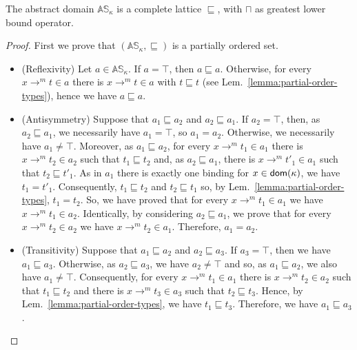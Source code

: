 \begin{proposition}\label{prop:complete_lattice}
  The abstract domain $\mathbb{AS}_\kappa$ is a complete lattice \wrt $\sqsubseteq$,
  with $\sqcap$ as greatest lower bound operator.
\end{proposition}
\begin{proof}
  First we prove that $(\mathbb{AS}_\kappa,\sqsubseteq)$ is a partially
  ordered set.
  \begin{itemize}
    \item (Reflexivity) Let $a\in\mathbb{AS}_\kappa$. If $a=\top$, then
      $a\sqsubseteq a$.
      Otherwise, for every $x\to^mt\in a$ there is $x\to^mt\in a$ with
    $t\sqsubseteq t$ (see Lem.~\ref{lemma:partial-order-types}), hence we have
    $a\sqsubseteq a$.
    \item (Antisymmetry) Suppose that $a_1 \sqsubseteq a_2$ and
    $a_2 \sqsubseteq a_1$. If $a_2=\top$, then, as $a_2 \sqsubseteq a_1$,
    we necessarily have $a_1=\top$, so $a_1=a_2$. Otherwise, we necessarily
    have $a_1\neq\top$. Moreover, as $a_1 \sqsubseteq a_2$, for every
    $x\to^mt_1\in a_1$ there is $x\to^mt_2\in a_2$ such that
    $t_1\sqsubseteq t_2$ and, as $a_2 \sqsubseteq a_1$, there is
    $x\to^mt'_1\in a_1$ such that $t_2\sqsubseteq t'_1$.
    As in $a_1$ there is exactly one binding for $x\in\mathsf{dom}(\kappa)$, we have
    $t_1=t'_1$. Consequently, $t_1\sqsubseteq t_2$ and $t_2\sqsubseteq t_1$
    so, by Lem.~\ref{lemma:partial-order-types}, $t_1=t_2$. So, we have
    proved that for every $x\to^mt_1\in a_1$ we have $x\to^mt_1\in a_2$.
    Identically, by considering $a_2 \sqsubseteq a_1$, we prove that
    for every $x\to^mt_2\in a_2$ we have $x\to^mt_2\in a_1$.
    Therefore, $a_1=a_2$.
    \item (Transitivity) Suppose that $a_1 \sqsubseteq a_2$ and
    $a_2 \sqsubseteq a_3$. If $a_3=\top$, then we have $a_1\sqsubseteq a_3$.
    Otherwise, as $a_2 \sqsubseteq a_3$, we have $a_2\neq\top$ and so, as
    $a_1 \sqsubseteq a_2$, we also have $a_1\neq\top$. Consequently, for every
    $x\to^mt_1\in a_1$ there is $x\to^mt_2\in a_2$ such that
    $t_1\sqsubseteq t_2$ and there is $x\to^mt_3\in a_3$ such that
    $t_2\sqsubseteq t_3$. Hence, by Lem.~\ref{lemma:partial-order-types},
    we have $t_1\sqsubseteq t_3$. Therefore, we have $a_1\sqsubseteq a_3$.
  \end{itemize}


\end{proof}
